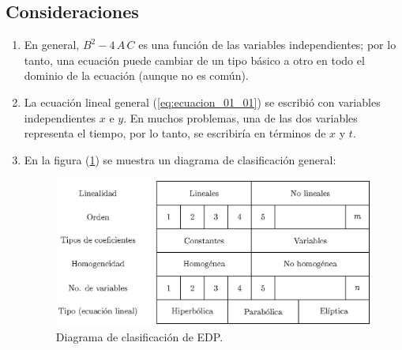 \subsection*{Consideraciones}
\begin{enumerate}
\item En general, $B^{2} - 4 \, A \, C$ es una función de las variables independientes; por lo tanto, una ecuación puede cambiar de un tipo básico a otro en todo el dominio de la ecuación (aunque no es común).
\item La ecuación lineal general (\ref{eq:ecuacion_01_01}) se escribió con variables independientes $x$ e $y$. En muchos problemas, una de las dos variables representa el tiempo, por lo tanto, se escribiría en términos de $x$ y $t$.
\item En la figura (\ref{fig:figura_clasificacion_EDP}) se muestra un diagrama de clasificación general:
\begin{figure}[H]
    \centering
    \includegraphics[scale=1.1]{Imagenes/Cuadro_Clasificacion_EDP.eps}
    \caption{Diagrama de clasificación de EDP.}
    \label{fig:figura_clasificacion_EDP}
\end{figure}
\end{enumerate}
